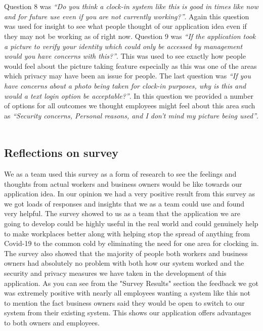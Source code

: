 \\
\\
Question 8 was \textit{“Do you think a clock-in system like this is good in times like now and for future use even if you are not currently working?”}. Again this question was used for insight to see what people thought of our application idea even if they may not be working as of right now. Question 9 was \textit{“If the application took a picture to verify your identity which could only be accessed by management would you have concerns with this?”}. This was used to see exactly how people would feel about the picture taking feature especially as this was one of the areas which privacy may have been an issue for people. The last question was \textit{“If you have concerns about a photo being taken for clock-in purposes, why is this and would a text login option be acceptable?”}. In this question we provided a number of options for all outcomes we thought employees might feel about this area such as \textit{“Security concerns, Personal reasons, and I don’t mind my picture being used”}.
\\
\\
\subsection{Reflections on survey}
We as a team used this survey as a form of research to see the feelings and thoughts from actual workers and business owners would be like towards our application idea. In our opinion we had a very positive result from this survey as we got loads of responses and insights that we as a team could use and found very helpful. The survey showed to us as a team that the application we are going to develop could be highly useful in the real world and could genuinely help to make workplaces better along with helping stop the spread of anything from Covid-19 to the common cold by eliminating the need for one area for clocking in. The survey also showed that the majority of people both workers and business owners had absolutely no problem with both how our system worked and the security and privacy measures we have taken in the development of this application. As you can see from the "Survey Results" section the feedback we got was extremely positive with nearly all employees wanting a system like this not to mention the fact business owners said they would be open to switch to our system from their existing system. This shows our application offers advantages to both owners and employees.
\\
\\

